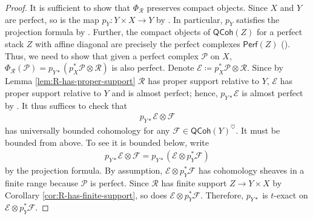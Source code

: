 \documentclass{article}
\numberwithin{equation}{section}
\theoremstyle{quest}
\theoremstyle{definition}
\theoremstyle{remark}
\begin{document}
\begin{proof}
	It is sufficient to show that $\Phi_{\mathscr{R}}$ preserves compact objects. Since $X$ and $Y$ are perfect, so is the map $p_Y:Y\times X\to Y$ by \cite[Corollary 3.23]{BFN}. In particular, $p_Y$ satisfies the projection formula by \cite[Proposition 3.10]{BFN}. Further, the compact objects of $\mathsf{QCoh}(Z)$ for a perfect stack $Z$ with affine diagonal are precisely the perfect complexes $\mathsf{Perf}(Z)$ (\cite[Proposition 3.9]{BFN}). Thus, we need to show that given a perfect complex $\mathscr{P}$ on $X$, $\Phi_{\mathscr{R}}(\mathscr{P})=p_{Y*}(p_X^*\mathscr{P}\otimes \mathscr{R})$ is also perfect. Denote $\mathscr{E}\coloneqq p_X^*\mathscr{P}\otimes \mathscr{R}$. Since by Lemma \ref{lem:R-has-proper-support} $\mathscr{R}$ has proper support relative to $Y$, $\mathscr{E}$ has proper support relative to $Y$ and is almost perfect; hence, $p_{Y*}\mathscr{E}$ is almost perfect by \cite[Proposition 2.28]{PS}. It thus suffices to check that
	\begin{align*}
		p_{Y*}\mathscr{E}\otimes \mathscr{F}
	\end{align*} 
	has universally bounded cohomology for any $\mathscr{F}\in \mathsf{QCoh}(Y)^\heartsuit$. It must be bounded from above. To see it is bounded below, write
	\begin{align*}
		p_{Y*}\mathscr{E}\otimes \mathscr{F}=p_{Y*}(\mathscr{E}\otimes p_Y^*\mathscr{F})
	\end{align*} 
by the projection formula. By assumption, $\mathscr{E}\otimes p_Y^*\mathscr{F}$ has cohomology sheaves in a finite range because $\mathscr{P}$ is perfect. Since $\mathscr{R}$ has finite support $Z\to Y\times X$ by Corollary \ref{cor:R-has-finite-support}, so does $\mathscr{E}\otimes p_{Y}^*\mathscr{F} $. Therefore, $p_{Y*}$ is $t$-exact on $\mathscr{E}\otimes p_Y^*\mathscr{F}$.
\end{proof} 
\end{document}
